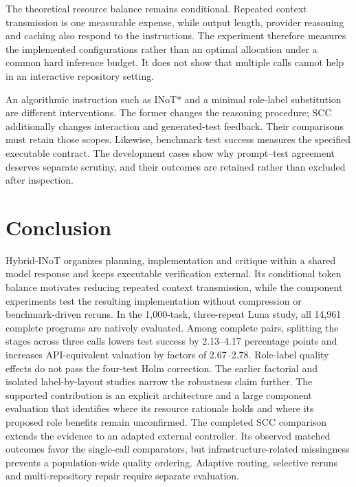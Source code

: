 The theoretical resource balance remains conditional. Repeated context transmission is one measurable expense, while output length, provider reasoning and caching also respond to the instructions. The experiment therefore measures the implemented configurations rather than an optimal allocation under a common hard inference budget. It does not show that multiple calls cannot help in an interactive repository setting.

An algorithmic instruction such as INoT* and a minimal role-label substitution are different interventions. The former changes the reasoning procedure; SCC additionally changes interaction and generated-test feedback. Their comparisons must retain those scopes. Likewise, benchmark test success measures the specified executable contract. The development cases show why prompt--test agreement deserves separate scrutiny, and their outcomes are retained rather than excluded after inspection.








\section{Conclusion}
Hybrid-INoT organizes planning, implementation and critique within a shared model response and keeps executable verification external. Its conditional token balance motivates reducing repeated context transmission, while the component experiments test the resulting implementation without compression or benchmark-driven reruns. In the 1,000-task, three-repeat Luna study, all 14,961 complete programs are natively evaluated. Among complete pairs, splitting the stages across three calls lowers test success by 2.13--4.17 percentage points and increases API-equivalent valuation by factors of 2.67--2.78. Role-label quality effects do not pass the four-test Holm correction. The earlier factorial and isolated label-by-layout studies narrow the robustness claim further. The supported contribution is an explicit architecture and a large component evaluation that identifies where its resource rationale holds and where its proposed role benefits remain unconfirmed. The completed SCC comparison extends the evidence to an adapted external controller. Its observed matched outcomes favor the single-call comparators, but infrastructure-related missingness prevents a population-wide quality ordering. Adaptive routing, selective reruns and multi-repository repair require separate evaluation.

